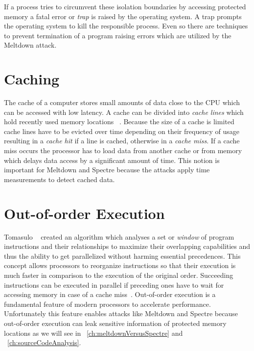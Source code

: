 \documentclass[a4paper,oneside,openright] {scrreprt}
\begin{document}
If a process tries to circumvent these isolation boundaries by accessing protected memory a fatal error or \textit{trap}
is raised by the operating system. A trap prompts the operating system to kill the responsible process.
Even so there are techniques to prevent termination of a program raising errors which are utilized by the Meltdown attack.

\section{Caching}
\label{ch:intro:chaching}

The cache of a computer stores small amounts of data close to the CPU which can be accessed with low latency. 
A cache can be divided into \textit{cache lines} which hold recently used memory locations ~\cite{tanenbaum2009modern:24-27}. 
Because the size of a cache is limited cache lines have to be evicted over time depending on their frequency 
of usage resulting in a \textit{cache hit} if a line is cached, otherwise in a \textit{cache miss}.
If a cache miss occurs the processor has to load data from another
cache or from memory which delays data access by a significant amount of time.
This notion is important for Meltdown and Spectre because the attacks apply time measurements to detect cached data. 

\section{Out-of-order Execution}
\label{ch:intro:motivation}

Tomasulo ~\cite{tomasulo1967efficient} created an algorithm which analyses a set or \textit{window} of
program instructions and their relationships to maximize their overlapping capabilities and thus the ability to get parallelized 
without harming essential precedences. This concept allows processors to reorganize instructions so that their execution is much faster 
in comparison to the execution of the original order.
Succeeding instructions can be executed in parallel if preceding ones
 have to wait for accessing memory in case of a cache miss~\cite{hennessy2011computer:183}.
Out-of-order execution is a fundamental feature of modern processors to accelerate performance.
Unfortunately this feature enables attacks like Meltdown and Spectre because out-of-order execution can leak sensitive information
of protected memory locations as we will see in ~\ref{ch:meltdownVersusSpectre} and ~\ref{ch:sourceCodeAnalysis}.
\end{document}
